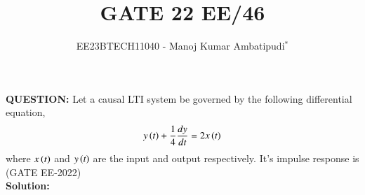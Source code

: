 \documentclass[journal,12pt,twocolumn]{IEEEtran}
\theoremstyle{remark}
\begin{document}

\vspace{3cm}
\title{GATE 22 EE/46}
\author{EE23BTECH11040 - Manoj Kumar Ambatipudi$^{*}$%
}
\maketitle
\newpage
\bigskip
\renewcommand{\thefigure}{\theenumi}
\renewcommand{\thetable}{\theenumi}
\textbf{QUESTION:}
Let a causal LTI system be governed by the following differential equation, 
\begin{align}
    y\left(t\right) + \frac{1}{4}\frac{dy}{dt} = 2x\left(t\right) \label{eq1}
\end{align}
where $x\left(t\right)$ and $y\left(t\right)$ are the input and output respectively. It's impulse response is 
\hfill (GATE EE-2022)\\
\textbf{Solution:}
\end{document}
